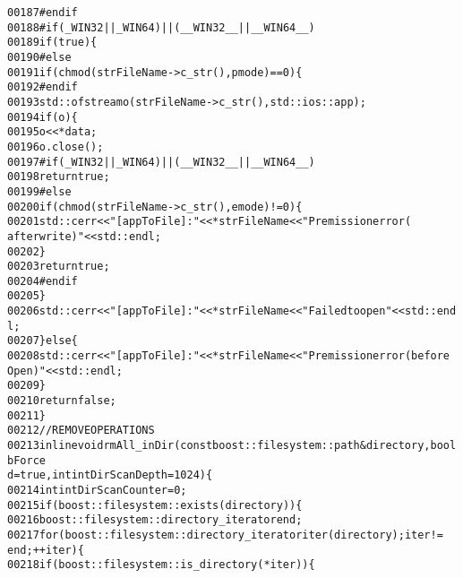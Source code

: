 \begin{footnotesize}
\begin{alltt}
00187 \textcolor{preprocessor}{#endif}
00188 \textcolor{preprocessor}{}\textcolor{preprocessor}{    #if ( \_WIN32 || \_WIN64 ) || ( \_\_WIN32\_\_ || \_\_WIN64\_\_ )}
00189 \textcolor{preprocessor}{}        \textcolor{keywordflow}{if}(\textcolor{keyword}{true})\{
00190 \textcolor{preprocessor}{    #else}
00191 \textcolor{preprocessor}{}        \textcolor{keywordflow}{if} (chmod(strFileName->c\_str(),pmode)==0)\{
00192 \textcolor{preprocessor}{    #endif}
00193 \textcolor{preprocessor}{}            std::ofstream o(strFileName->c\_str(),std::ios::app);
00194             \textcolor{keywordflow}{if}(o)\{
00195                 o << *data;
00196                 o.close();
00197 \textcolor{preprocessor}{            #if ( \_WIN32 || \_WIN64 ) || ( \_\_WIN32\_\_ || \_\_WIN64\_\_ )}
00198 \textcolor{preprocessor}{}                \textcolor{keywordflow}{return} \textcolor{keyword}{true};
00199 \textcolor{preprocessor}{            #else}
00200 \textcolor{preprocessor}{}                \textcolor{keywordflow}{if} (chmod(strFileName->c\_str(),emode)!=0)\{
00201                     std::cerr<<\textcolor{stringliteral}{"[appToFile]: "}<<*strFileName<<\textcolor{stringliteral}{" Premission error(
      after write)"}<<std::endl;
00202                 \}
00203                 \textcolor{keywordflow}{return} \textcolor{keyword}{true};
00204 \textcolor{preprocessor}{            #endif}
00205 \textcolor{preprocessor}{}            \}
00206             std::cerr<<\textcolor{stringliteral}{"[appToFile]: "}<<*strFileName<<\textcolor{stringliteral}{" Failed to open"}<<std::end
      l;
00207         \}\textcolor{keywordflow}{else}\{
00208             std::cerr<<\textcolor{stringliteral}{"[appToFile]: "}<<*strFileName<<\textcolor{stringliteral}{" Premission error (before 
      Open)"}<<std::endl;
00209         \}
00210         \textcolor{keywordflow}{return} \textcolor{keyword}{false};
00211     \}
00212     \textcolor{comment}{//REMOVE OPERATIONS}
00213     \textcolor{keyword}{inline} \textcolor{keywordtype}{void} rmAll\_inDir(\textcolor{keyword}{const} boost::filesystem::path & directory,\textcolor{keywordtype}{bool} bForce
      d = \textcolor{keyword}{true},\textcolor{keywordtype}{int} intDirScanDepth =1024)\{
00214         \textcolor{keywordtype}{int} intDirScanCounter = 0;
00215         \textcolor{keywordflow}{if}( boost::filesystem::exists( directory ) )\{
00216             boost::filesystem::directory\_iterator end ;
00217             \textcolor{keywordflow}{for}( boost::filesystem::directory\_iterator iter(directory) ; iter != 
      end ; ++iter )\{
00218                 \textcolor{keywordflow}{if} ( boost::filesystem::is\_directory( *iter ) )\{

\end{alltt}
\end{footnotesize}
